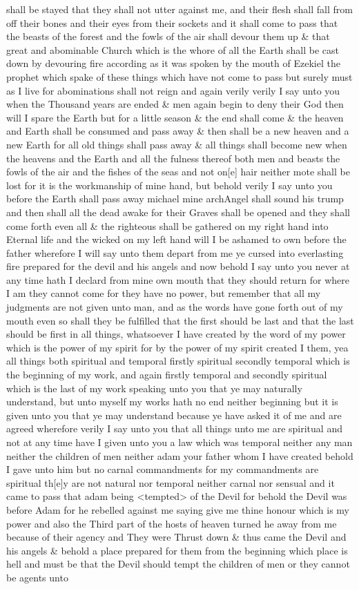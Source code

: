 shall be stayed that they shall not utter against me, and their flesh shall fall from off their bones and their eyes from their sockets and it shall come to pass that the beasts of the forest and the fowls of the air shall devour them up \& that great and abominable Church which is the whore of all the Earth shall be cast down by devouring fire according as it was spoken by the mouth of Ezekiel the prophet which spake of these things which have not come to pass but surely must as I live for abominations shall not reign and again verily verily I say unto you when the Thousand years are ended \& men again begin to deny their God then will I spare the Earth but for a little season \& the end shall come \& the heaven and Earth shall be consumed and pass away \& then shall be a new heaven and a new Earth for all old things shall pass away \& all things shall become new when the heavens and the Earth and all the fulness thereof both men and beasts the fowls of the air and the fishes of the seas and not on[e] hair neither mote shall be lost for it is the workmanship of mine hand, but behold verily I say unto you before the Earth shall pass away michael mine archAngel shall sound his trump and then shall all the dead awake for their Graves shall be opened and they shall come forth even all \& the righteous shall be gathered on my right hand into Eternal life and the wicked on my left hand will I be ashamed to own before the father wherefore I will say unto them depart from me ye cursed into everlasting fire prepared for the devil and his angels and now behold I say unto you never at any time hath I declard from mine own mouth that they should return for where I am they cannot come for they have no power, but remember that all my judgments are not given unto man, and as the words have gone forth out of my mouth even so shall they be fulfilled that the first should be last and that the last should be first in all things, whatsoever I have created by the word of my power which is the power of my spirit for by the power of my spirit created I them, yea all things both spiritual and temporal firstly spiritual secondly temporal which is the beginning of my work, and again firstly temporal and secondly spiritual which is the last of my work speaking unto you that ye may naturally understand, but unto myself my works hath no end neither beginning but it is given unto you that ye may understand because ye have asked it of me and are agreed wherefore verily I say unto you that all things unto me are spiritual and not at any time have I given unto you a law which was temporal neither any man neither the children of men neither adam your father whom I have created behold I gave unto him but no carnal commandments for my commandments are spiritual th[e]y are not natural nor temporal neither carnal nor sensual and it came to pass that adam being <tempted> of the Devil for behold the Devil was before Adam for he rebelled against me saying give me thine honour which is my power and also the Third part of the hosts of heaven turned he away from me because of their agency and They were Thrust down \& thus came the Devil and his angels \& behold a place prepared for them from the beginning which place is hell and must be that the Devil should tempt the children of men or they cannot be agents unto 